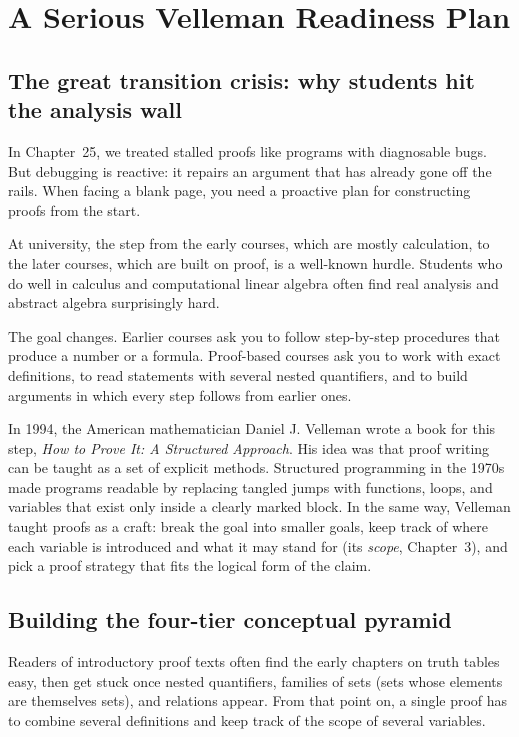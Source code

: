 \section{A Serious Velleman Readiness Plan}
\chapterline

\subsection{The great transition crisis: why students hit the analysis wall}

In Chapter~25, we treated stalled proofs like programs with diagnosable bugs. But debugging is reactive: it repairs an argument that has already gone off the rails. When facing a blank page, you need a proactive plan for constructing proofs from the start.

At university, the step from the early courses, which are mostly calculation, to the later courses, which are built on proof, is a well-known hurdle. Students who do well in calculus and computational linear algebra often find real analysis and abstract algebra surprisingly hard.

The goal changes. Earlier courses ask you to follow step-by-step procedures that produce a number or a formula. Proof-based courses ask you to work with exact definitions, to read statements with several nested quantifiers, and to build arguments in which every step follows from earlier ones.

In 1994, the American mathematician Daniel J. Velleman wrote a book for this step, \emph{How to Prove It: A Structured Approach}. His idea was that proof writing can be taught as a set of explicit methods. Structured programming in the 1970s made programs readable by replacing tangled jumps with functions, loops, and variables that exist only inside a clearly marked block. In the same way, Velleman taught proofs as a craft: break the goal into smaller goals, keep track of where each variable is introduced and what it may stand for (its \emph{scope}, Chapter~3), and pick a proof strategy that fits the logical form of the claim.

\subsection{Building the four-tier conceptual pyramid}
\label{26:sec-pyramid}

Readers of introductory proof texts often find the early chapters on truth tables easy, then get stuck once nested quantifiers, families of sets (sets whose elements are themselves sets), and relations appear. From that point on, a single proof has to combine several definitions and keep track of the scope of several variables.


